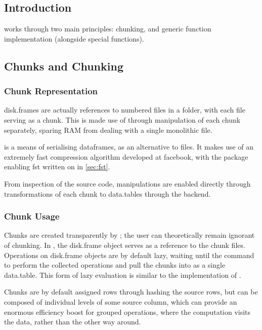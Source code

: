 \subsection{Introduction}\label{sec:disk-frame-introduction}

 works through two main principles: chunking, and generic function implementation (alongside special functions).

\subsection{Chunks and Chunking}\label{sec:chunking}

\subsubsection{Chunk Representation}\label{sec:chunk-representation}

disk.frames are actually references to numbered  files in a folder, with each file serving as a chunk.
This is made use of through manipulation of each chunk separately, sparing RAM from dealing with a single monolithic file\cite{zj19:_inges_data}.

 is a means of serialising dataframes, as an alternative to 
files\cite{klik2022fst}.
It makes use of an extremely fast compression algorithm developed at facebook, with the \R{} package enabling fst written on in \cref{sec:fst}.

From inspection of the source code,  manipulations are enabled directly through transformations of each chunk to data.tables through the  backend.

\subsubsection{Chunk Usage}\label{sec:making-chunks}

Chunks are created transparently by ; the user can theoretically remain ignorant of chunking.
In \R{}, the disk.frame object serves as a reference to the chunk files.
Operations on disk.frame objects are by default lazy, waiting until the  command to perform the collected operations and pull the chunks into \R{} as a single data.table.
This form of lazy evaluation is similar to the implementation of .

Chunks are by default assigned rows through hashing the source rows, but can be composed of individual levels of some source column, which can provide an enormous efficiency boost for grouped operations, where the computation visits the data, rather than the other way around.

